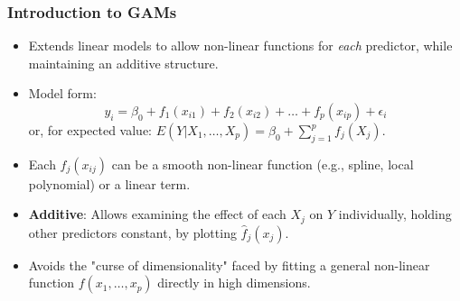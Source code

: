 \documentclass[12pt,a4paper]{article}
\begin{document}
\begin{itemize}
    \subsubsection{Introduction to GAMs }
        \begin{itemize}
            \item Extends linear models to allow non-linear functions for \textit{each} predictor, while maintaining an additive structure.
            \item Model form:
                $$ y_i = \beta_0 + f_1(x_{i1}) + f_2(x_{i2}) + \dots + f_p(x_{ip}) + \epsilon_i $$
                or, for expected value: $E(Y|X_1, \dots, X_p) = \beta_0 + \sum_{j=1}^p f_j(X_j)$.
            \item Each $f_j(x_{ij})$ can be a smooth non-linear function (e.g., spline, local polynomial) or a linear term.
            \item \textbf{Additive}: Allows examining the effect of each $X_j$ on $Y$ individually, holding other predictors constant, by plotting $\hat{f}_j(x_j)$.
            \item Avoids the "curse of dimensionality" faced by fitting a general non-linear function $f(x_1, \dots, x_p)$ directly in high dimensions.
        \end{itemize}


\end{itemize}
\end{document}
